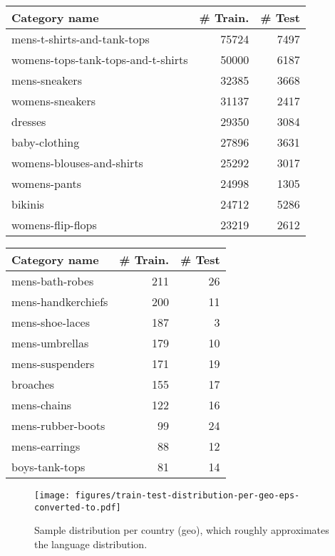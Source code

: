 \documentclass{bmvc2k}
\begin{document}
\begin{table}[thb]
\begin{tabular}{|l|r|r|}
\hline
                      Category name &  \# Train. &  \# Test \\
\hline
        mens-t-shirts-and-tank-tops &    75724 &    7497 \\
 womens-tops-tank-tops-and-t-shirts &    50000 &    6187 \\
                      mens-sneakers &    32385 &    3668 \\
                    womens-sneakers &    31137 &    2417 \\
                            dresses &    29350 &    3084 \\
                      baby-clothing &    27896 &    3631 \\
          womens-blouses-and-shirts &    25292 &    3017 \\
                       womens-pants &    24998 &    1305 \\
                            bikinis &    24712 &    5286 \\
                  womens-flip-flops &    23219 &    2612 \\
\hline
\end{tabular}
\begin{tabular}{|l|r|r|}
\hline
      Category name &  \# Train. &  \# Test \\
\hline
    mens-bath-robes &      211 &      26 \\
 mens-handkerchiefs &      200 &      11 \\
    mens-shoe-laces &      187 &       3 \\
     mens-umbrellas &      179 &      10 \\
    mens-suspenders &      171 &      19 \\
           broaches &      155 &      17 \\
        mens-chains &      122 &      16 \\
  mens-rubber-boots &       99 &      24 \\
      mens-earrings &       88 &      12 \\
     boys-tank-tops &       81 &      14 \\
\hline
\end{tabular}
\end{table}


\begin{figure}[thb]
\texttt{[image: figures/train-test-distribution-per-geo-eps-converted-to.pdf]}
\caption{
Sample distribution per country (geo), which roughly approximates the language distribution.
} \label{fig:geo}
\end{figure}
\end{document}
